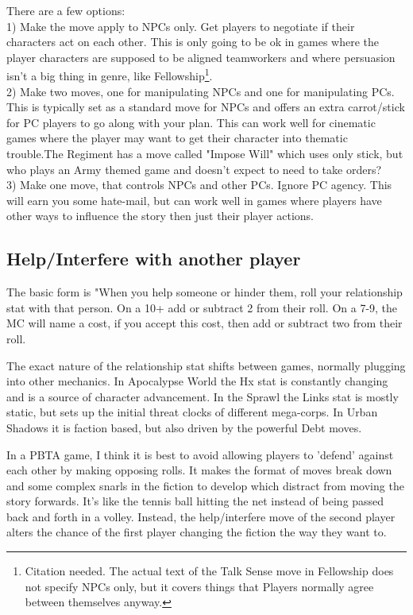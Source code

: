 \documentclass{tufte-handout}
\begin{document}
There are a few options:\\
1) Make the move apply to NPCs only. Get players to negotiate if their characters act on each other. This is only going to be ok in games where the player characters are supposed to be aligned teamworkers and where persuasion isn't a big thing in genre, like Fellowship\footnote{Citation needed. The actual text of the Talk Sense move in Fellowship does not specify NPCs only, but it covers things that Players normally agree between themselves anyway.}. \\
2) Make two moves, one for manipulating NPCs and one for manipulating PCs. This is typically set as a standard move for NPCs and offers an extra carrot/stick for PC players to go along with your plan. This can work well for cinematic games where the player may want to get their character into thematic trouble.The Regiment has a move called "Impose Will" which uses only stick, but who plays an Army themed game and doesn't expect to need to take orders?\\
3) Make one move, that controls NPCs and other PCs. Ignore PC agency. This will earn you some hate-mail, but can work well in games where players have other ways to influence the story then just their player actions. 

\subsection{Help/Interfere with another player}
The basic form is "When you help someone or hinder them, roll your relationship stat with that person. On a 10+ add or subtract 2 from their roll. On a 7-9, the MC will name a cost, if you accept this cost, then add or subtract two from their roll.

The exact nature of the relationship stat shifts between games, normally plugging into other mechanics. In Apocalypse World the Hx stat is constantly changing and is a source of character advancement. In the Sprawl the Links stat is mostly static, but sets up the initial threat clocks of different mega-corps. In Urban Shadows it is faction based, but also driven by the powerful Debt moves.

In a PBTA game, I think it is best to avoid allowing players to 'defend' against each other by making opposing rolls. It makes the format of moves break down and some complex snarls in the fiction to develop which distract from moving the story forwards. It's like the tennis ball hitting the net instead of being passed back and forth in a volley. Instead, the help/interfere move of the second player alters the chance of the first player changing the fiction the way they want to.
\end{document}
